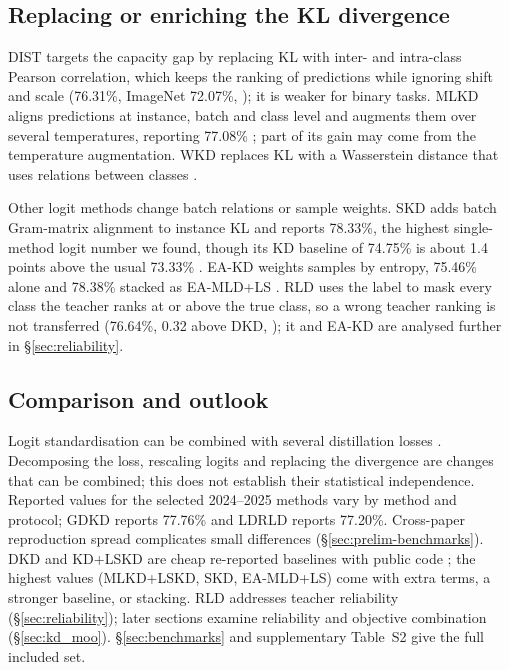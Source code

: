 \subsection{Replacing or enriching the KL divergence}
\label{sec:logit-div}

DIST \citep{huang2022dist} targets the capacity gap by replacing KL with inter- and intra-class Pearson correlation, which keeps the ranking of predictions while ignoring shift and scale (76.31\%, ImageNet 72.07\%, \citealp[Tables~5 and~2]{huang2022dist}); it is weaker for binary tasks. MLKD \citep{jin2023mlkd} aligns predictions at instance, batch and class level and augments them over several temperatures, reporting 77.08\% \citep[Table~2]{jin2023mlkd}; part of its gain may come from the temperature augmentation. WKD replaces KL with a Wasserstein distance that uses relations between classes \citep{lv2024wkd}.

Other logit methods change batch relations or sample weights. SKD \citep{jeong2026skd} adds batch Gram-matrix alignment to instance KL and reports 78.33\%, the highest single-method logit number we found, though its KD baseline of 74.75\% is about 1.4 points above the usual 73.33\% \citep[Table~1]{jeong2026skd}. EA-KD \citep{su2025eakd} weights samples by entropy, 75.46\% alone and 78.38\% stacked as EA-MLD+LS \citep[Table~2]{su2025eakd}. RLD \citep{sun2025rld} uses the label to mask every class the teacher ranks at or above the true class, so a wrong teacher ranking is not transferred (76.64\%, 0.32 above DKD, \citealp[Table~1]{sun2025rld}); it and EA-KD are analysed further in \S\ref{sec:reliability}.

\subsection{Comparison and outlook}
\label{sec:logit-compare}

Logit standardisation can be combined with several distillation losses \citep[Table~2]{sun2024lskd}. Decomposing the loss, rescaling logits and replacing the divergence are changes that can be combined; this does not establish their statistical independence. Reported values for the selected 2024--2025 methods vary by method and protocol; GDKD reports 77.76\% and LDRLD reports 77.20\%. Cross-paper reproduction spread complicates small differences (\S\ref{sec:prelim-benchmarks}). DKD and KD+LSKD are cheap re-reported baselines with public code \citep[Table~1]{xu2025ldrld}; the highest values (MLKD+LSKD, SKD, EA-MLD+LS) come with extra terms, a stronger baseline, or stacking. RLD addresses teacher reliability (\S\ref{sec:reliability}); later sections examine reliability and objective combination (\S\ref{sec:kd_moo}). \S\ref{sec:benchmarks} and supplementary Table~S2 give the full included set.
